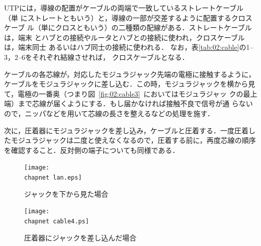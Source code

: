 UTPには，導線の配置がケーブルの両端で一致しているストレートケーブル（単
にストレートともいう）と，導線の一部が交差するように配置するクロスケーブ
ル（単にクロスともいう）の二種類の配線がある．ストレートケーブルは，端末
とハブとの接続やルータとハブとの接続に使われ，クロスケーブルは，端末同士
あるいはハブ同士の接続に使われる．
なお，表\ref{tab:02:cable}の1--3，2--6をそれぞれ結線させれば，
クロスケーブルとなる．

ケーブルの各芯線が，対応したモジュラジャック先端の電極に接触するように，
ケーブルをモジュラジャックに差し込む．この時，モジュラジャックを横から見
て，電極の一番奥（つまり図~\ref{fig:02:cable3}~においてはモジュラジャッ
クの最上端）まで芯線が届くようにする．もし届かなければ接触不良で信号が通
らないので，ニッパなどを用いて芯線の長さを整えるなどの処理を施す．

次に，圧着器にモジュラジャックを差し込み，ケーブルと圧着する．一度圧着し
たモジュラジャックは二度と使えなくなるので，圧着する前に，再度芯線の順序
を確認すること．反対側の端子についても同様である．

\begin{figure}
\begin{minipage}{.39\columnwidth}
\begin{center}
\texttt{[image: \\chapnet lan.eps]}
\vspace*{1zh}
\caption{ジャックを下から見た場合}
\label{fig:02:cable3}
\end{center}
\end{minipage}
\begin{minipage}{.6\columnwidth}
\begin{center}
\texttt{[image: \\chapnet cable4.ps]}
\vspace*{1zh}
\caption{圧着器にジャックを差し込んだ場合}
\label{fig:02:cable4}
\end{center}
\end{minipage}
\end{figure}

